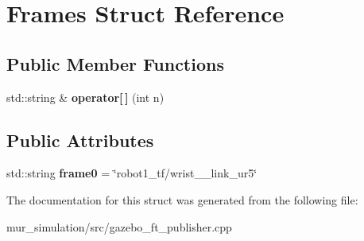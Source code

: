 \hypertarget{structFrames}{}\section{Frames Struct Reference}
\label{structFrames}
\subsection*{Public Member Functions}
\begin{DoxyCompactItemize}
\item 
\mbox{\label{structFrames_a137b3a0f89cd6b5f72023eb6556fb10a}} 
std\+::string \& {\bfseries operator\mbox{[}$\,$\mbox{]}} (int n)
\end{DoxyCompactItemize}
\subsection*{Public Attributes}
\begin{DoxyCompactItemize}
\item 
\mbox{\label{structFrames_a2ec0254afffbd55a00476d0115539c5f}} 
std\+::string {\bfseries frame0} = \char`\"{}robot1\+\_\+tf/wrist\+\_\+\_\+link\+\_\+ur5\char`\"{}
\end{DoxyCompactItemize}


The documentation for this struct was generated from the following file\+:\begin{DoxyCompactItemize}
\item 
mur\+\_\+simulation/src/gazebo\+\_\+ft\+\_\+publisher.\+cpp\end{DoxyCompactItemize}
